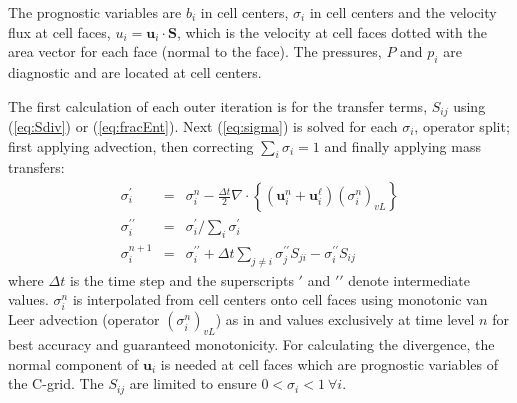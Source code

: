 \documentclass[draft]{agujournal2019}
\begin{document}
The prognostic variables are  $b_{i}$ in cell centers,  $\sigma_{i}$
in cell centers and the velocity flux at cell faces, $u_{i}=\mathbf{u}_{i}\cdot\mathbf{S}$,
which is the velocity at cell faces dotted with the area vector for
each face (normal to the face). The pressures, $P$ and $p_{i}$ are
diagnostic and are located at cell centers.

The first calculation of each outer iteration is for the transfer terms, $S_{ij}$ using ({\protect\ref{eq:Sdiv}}) or ({\protect\ref{eq:fracEnt}}). Next
(\ref{eq:sigma}) is solved
for each $\sigma_{i}$, operator split; first applying advection,
then correcting $\sum_{i}\sigma_{i}=1$ and finally applying mass transfers:
\begin{eqnarray}
\sigma_{i}^{\prime} & = & \sigma_{i}^{n}-\frac{\Delta t}{2}\nabla\cdot\left\{ \left(\mathbf{u}_{i}^{n}+\mathbf{u}_{i}^{\ell}\right)\left(\sigma_{i}^{n}\right)_{vL}\right\}
\\
\sigma_{i}^{\prime\prime} & = & \sigma_{i}^{\prime}\bigg/\sum_{i}\sigma_{i}^{\prime}
\\
\sigma_{i}^{n+1} & = & \sigma_{i}^{\prime\prime}+\Delta t\sum_{j\ne i}\sigma_{j}^{\prime\prime}S_{ji}-\sigma_{i}^{\prime\prime}S_{ij}
\end{eqnarray}
where $\Delta t$ is the time step and the superscripts $\prime$
and $\prime\prime$ denote intermediate values. $\sigma_{i}^{n}$
is interpolated from cell centers onto cell faces using monotonic
van Leer advection (operator $(\sigma_{i}^{n})_{vL}$) as in 
and values exclusively at time level $n$ for best accuracy and guaranteed
monotonicity. For calculating the divergence, the normal component
of $\mathbf{u}_{i}$ is needed at cell faces which are prognostic
variables of the C-grid. The $S_{ij}$ are limited to ensure $0<\sigma_{i}<1\ \forall i$. 
\end{document}
